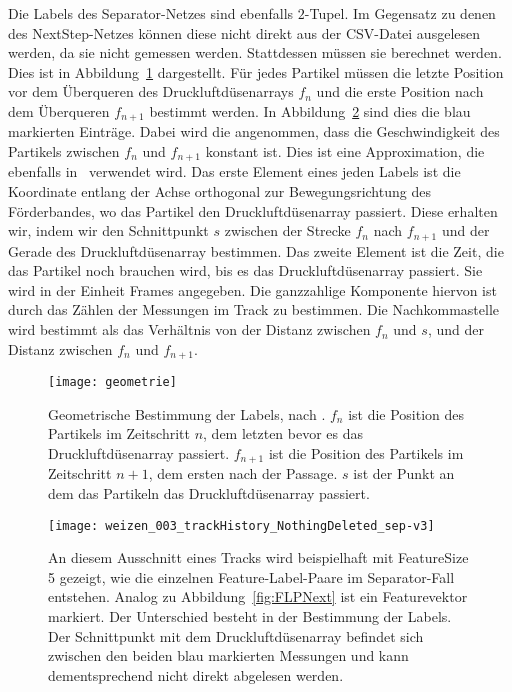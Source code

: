 Die Labels des Separator-Netzes sind ebenfalls \(2\)-Tupel.
Im Gegensatz zu denen des NextStep-Netzes können diese nicht direkt aus der CSV-Datei ausgelesen werden, da sie nicht gemessen werden.
Stattdessen müssen sie berechnet werden.
Dies ist in Abbildung~\ref{fig:Schnittpunkt} dargestellt.
Für jedes Partikel müssen die letzte Position vor dem Überqueren des Druckluftdüsenarrays \(f_n\) 
und die erste Position nach dem Überqueren \(f_{n+1}\) bestimmt werden.
In Abbildung~\ref{fig:FLPSep} sind dies die blau markierten Einträge. 
Dabei wird die angenommen, dass die Geschwindigkeit des Partikels zwischen \(f_n\) und \(f_{n+1}\) konstant ist.
Dies ist eine Approximation, die ebenfalls in~\cite{Pfaff2018} verwendet wird.
Das erste Element eines jeden Labels ist die Koordinate entlang der Achse orthogonal zur Bewegungsrichtung des Förderbandes, wo das Partikel den Druckluftdüsenarray passiert.
Diese erhalten wir, indem wir den Schnittpunkt \(s\) zwischen der Strecke \(f_n\) nach \(f_{n+1}\) und 
der Gerade des Druckluftdüsenarray bestimmen.
Das zweite Element ist die Zeit, die das Partikel noch brauchen wird, bis es das Druckluftdüsenarray passiert.
Sie wird in der Einheit Frames angegeben.
Die ganzzahlige Komponente hiervon ist durch das Zählen der Messungen im Track zu bestimmen.
Die Nachkommastelle wird bestimmt als das Verhältnis von der Distanz zwischen \(f_n\) und \(s\), 
und der Distanz zwischen \(f_n\) und \(f_{n+1}\).

\begin{figure}[h]
	\centering
	\texttt{[image: geometrie]}
	\caption[Geometrische Bestimmung der Labels, nach \cite{Pfaff2018}.]{Geometrische Bestimmung der Labels, nach \cite{Pfaff2018}. 
	\(f_n\) ist die Position des Partikels im Zeitschritt \(n\), dem letzten bevor es das Druckluftdüsenarray passiert.
	\(f_{n+1}\) ist die Position des Partikels im Zeitschritt \(n+1\), dem ersten nach der Passage.
	\(s\) ist der Punkt an dem das Partikeln das Druckluftdüsenarray passiert.
	}
	\label{fig:Schnittpunkt}
\end{figure}

\begin{figure}[h]
	\centering
	\texttt{[image: weizen\_003\_trackHistory\_NothingDeleted\_sep-v3]}
	\caption[Beispiel Feature-Label-Paar Separator]{An diesem Ausschnitt eines Tracks wird beispielhaft mit FeatureSize 5 gezeigt, wie die einzelnen Feature-Label-Paare im Separator-Fall entstehen.
	Analog zu Abbildung~\ref{fig:FLPNext} ist ein Featurevektor markiert. Der Unterschied besteht in der Bestimmung der Labels. 
	Der Schnittpunkt mit dem Druckluftdüsenarray befindet sich zwischen den beiden blau markierten Messungen und kann dementsprechend nicht direkt abgelesen werden.}
	\label{fig:FLPSep}
\end{figure}


